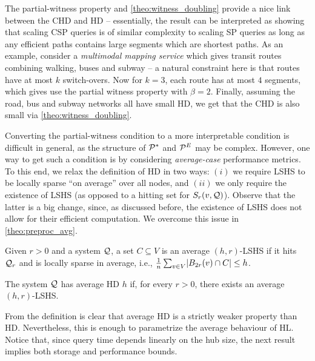 The partial-witness property and \cref{theo:witness_doubling} provide a nice link between the CHD and HD -- essentially, the result can be interpreted as showing that scaling CSP queries is of similar complexity to scaling SP queries as long as any efficient paths contains large segments which are shortest paths. As an example, consider a \emph{multimodal mapping service} which gives transit routes combining walking, buses and subway -- a natural constraint here is that routes have at most $k$ switch-overs. Now for $k=3$, each route has at most $4$ segments, which gives use the partial witness property with $\beta = 2$. Finally, assuming the road, bus and subway networks all have small HD, we get that the CHD is also small via \cref{theo:witness_doubling}.


Converting the partial-witness condition to a more interpretable condition is difficult in general, as the structure of $\mathcal{P}^*$ and $\mathcal{P}^E$ may be complex. However, one way to get such a condition is by considering \emph{average-case} performance metrics.
To this end, we relax the definition of HD in two ways: $(i)$ we require LSHS to be locally sparse ``on average'' over all nodes, and
$(ii)$ we only require the existence of LSHS (as opposed to a hitting set for $S_r(v,\mathcal{Q})$).
Observe that the latter is a big change, since, as discussed before, the existence of LSHS does not allow for their efficient computation.
We overcome this issue in \cref{theo:preproc_avg}.

\begin{definition}
Given $r>0$ and a system $\mathcal{Q}$, a set $C\subseteq V$ is an average $(h,r)$-LSHS if it hits $\mathcal{Q}_r$ and is locally sparse in average, i.e.,
$\frac{1}{n}\sum_{v\in V} \lvert B_{2r}(v)\cap C\rvert \leq h$.
\end{definition}

\begin{definition}[Average HD]
The system $\mathcal{Q}$ has average HD $h$ if, for every $r>0$, there exists an average $(h,r)$-LSHS.
\end{definition}

From the definition is clear that average HD is a strictly weaker property than HD.
Nevertheless, this is enough to parametrize the average behaviour of HL.
Notice that, since query time depends linearly on the hub size, the next result implies both storage and performance bounds.

